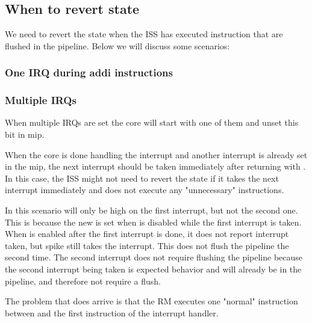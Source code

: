 



\textbf{}

\subsection{When to revert state}

We need to revert the state when the ISS has executed instruction that are flushed in the pipeline.
Below we will discuss some scenarios:

\subsubsection{One IRQ during addi instructions}

\subsubsection{Multiple IRQs}

When multiple IRQs are set the core will start with one of them and unset this bit in mip. 


When the core is done handling the interrupt and another interrupt is already set in the mip, the next interrupt should be taken immediately after returning with . In this case, the ISS might not need to revert the state if it takes the next interrupt immediately and does not execute any "unnecessary" instructions. 

In this scenario  will only be high on the first interrupt, but not the second one. This is because the new  is set when  is disabled while the first interrupt is taken. When  is enabled after the first interrupt is done, it does not report interrupt taken, but spike still takes the interrupt. This does not flush the pipeline the second time. The second interrupt does not require flushing the pipeline because the second interrupt being taken is expected behavior and will already be in the pipeline, and therefore not require a flush.

The problem that does arrive is that the RM executes one "normal" instruction between  and the first instruction of the interrupt handler. 

